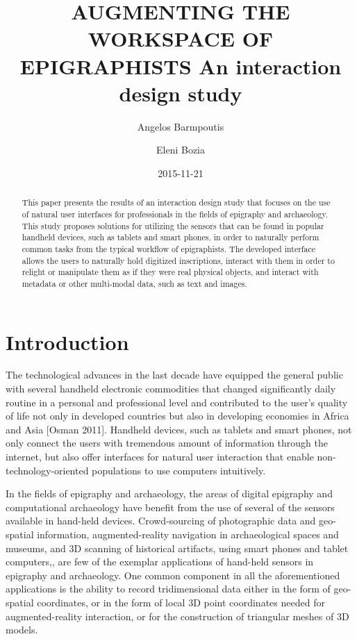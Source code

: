\documentclass[amsthm,ebook]{saparticle}
\title{AUGMENTING THE WORKSPACE OF EPIGRAPHISTS
An interaction design study}
\author[1]{Angelos Barmpoutis\corref{first}}
\author[2]{Eleni Bozia}
\date{2015-11-21}
\begin{document}
\maketitle
\begin{abstract}
This paper presents the results of an interaction design study that focuses on the use of natural user
interfaces for professionals in the fields of epigraphy and archaeology. This study proposes solutions for utilizing
the sensors that can be found in popular handheld devices, such as tablets and smart phones, in order to naturally
perform common tasks from the typical workflow of epigraphists. The developed interface allows the users to naturally
hold digitized inscriptions, interact with them in order to relight or manipulate them as if they were real physical
objects, and interact with metadata or other multi-modal data, such as text and images. 
\end{abstract}

\section{Introduction}


The technological advances in the last decade have equipped the general public with several handheld electronic
commodities that changed significantly daily routine in a personal and professional level and contributed to the user's
quality of life not only in developed countries but also in developing economies in Africa and Asia [Osman 2011].
Handheld devices, such as tablets and smart phones, not only connect the users with tremendous amount of information
through the internet, but also offer interfaces for natural user interaction that enable non-technology-oriented
populations to use computers intuitively.

In the fields of epigraphy and archaeology, the areas of digital epigraphy and computational archaeology have benefit
from the use of several of the sensors available in hand-held devices. Crowd-sourcing of photographic data and
geo-spatial information, augmented-reality navigation in archaeological spaces and museums, and 3D scanning of
historical artifacts, using smart phones and tablet computers,, are few of the exemplar applications of hand-held
sensors in epigraphy and archaeology. One common component in all the aforementioned applications is the ability to
record tridimensional data either in the form of geo-spatial coordinates, or in the form of local 3D point coordinates
needed for augmented-reality interaction, or for the construction of triangular meshes of 3D models. 
\end{document}
